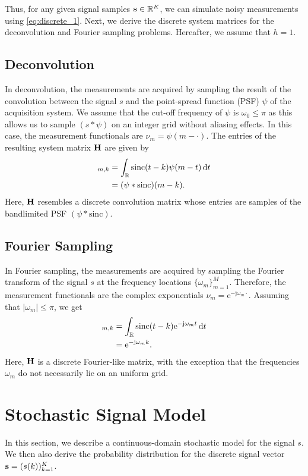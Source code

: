 \documentclass[journal]{IEEEtran}
\begin{document}
Thus, for any given signal samples ${\bf{s}} \in \mathbb{R}^{K}$, we can simulate noisy measurements using \eqref{eq:discrete_1}. Next, we derive the discrete system matrices for the deconvolution and Fourier sampling problems. Hereafter, we assume that $h=1$. 

\subsection{Deconvolution}\label{sec:deconv_forward}
In deconvolution, the measurements are acquired by sampling the result of the convolution between the signal $s$ and the point-spread function (PSF) $\psi$ of the acquisition system. We assume that the cut-off frequency of $\psi$ is $\omega_0 \leq \pi$ as this allows us to sample $(s*\psi)$ on an integer grid without aliasing effects. In this case, the measurement functionals are $\nu_m = \psi(m - \cdot)$. The entries of the resulting system matrix ${\bf{H}}$ are given by
\begin{align}
    [\M H]_{m,k} &= \int_{\R} \text{sinc}(t - k) \psi(m - t) \ud t \nonumber \\
                 &= (\psi*\text{sinc})(m-k).
\end{align} 
Here, ${\bf{H}}$ resembles a discrete convolution matrix whose entries are samples of the bandlimited PSF $(\psi*\text{sinc})$.

\subsection{Fourier Sampling}\label{sec:fourier_sampling_forward}
In Fourier sampling, the measurements are acquired by sampling the Fourier transform of the signal $s$ at the frequency locations $\{\omega_m\}_{m=1}^{M}$. Therefore, the measurement functionals are the complex exponentials $\nu_m = \mathrm{e}^{-\mathrm{j} \omega_m \cdot}$. Assuming that $|\omega_m| \leq \pi$, we get
\begin{align}
    [\M H]_{m,k} &= \int_{\R} \text{sinc}(t - k) \mathrm{e}^{-\mathrm{j} \omega_m t} \ud t \nonumber \\
                 &= \mathrm{e}^{-\mathrm{j} \omega_m k}.
\end{align} 
Here, ${\bf{H}}$ is a discrete Fourier-like matrix, with the exception that the frequencies $\omega_m$ do not necessarily lie on an uniform grid.


\section{Stochastic Signal Model}
In this section, we describe a continuous-domain stochastic model for the signal $s$. We then also derive the probability distribution for the discrete signal vector ${\bf{s}} = (s(k))_{k=1}^{K}$. 
\end{document}
